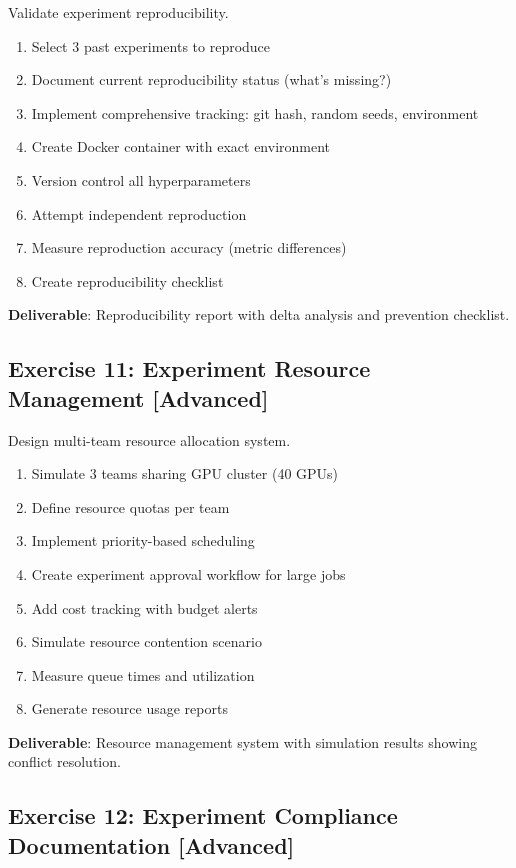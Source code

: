 Validate experiment reproducibility.

\begin{enumerate}
    \item Select 3 past experiments to reproduce
    \item Document current reproducibility status (what's missing?)
    \item Implement comprehensive tracking: git hash, random seeds, environment
    \item Create Docker container with exact environment
    \item Version control all hyperparameters
    \item Attempt independent reproduction
    \item Measure reproduction accuracy (metric differences)
    \item Create reproducibility checklist
\end{enumerate}

\textbf{Deliverable}: Reproducibility report with delta analysis and prevention checklist.

\subsection{Exercise 11: Experiment Resource Management [Advanced]}

Design multi-team resource allocation system.

\begin{enumerate}
    \item Simulate 3 teams sharing GPU cluster (40 GPUs)
    \item Define resource quotas per team
    \item Implement priority-based scheduling
    \item Create experiment approval workflow for large jobs
    \item Add cost tracking with budget alerts
    \item Simulate resource contention scenario
    \item Measure queue times and utilization
    \item Generate resource usage reports
\end{enumerate}

\textbf{Deliverable}: Resource management system with simulation results showing conflict resolution.

\subsection{Exercise 12: Experiment Compliance Documentation [Advanced]}

